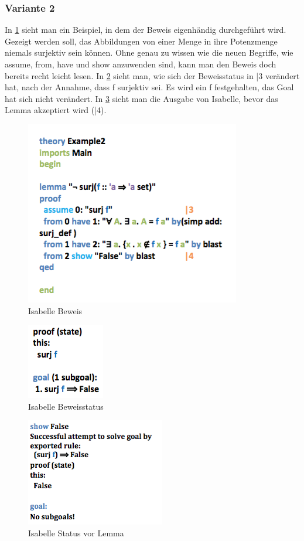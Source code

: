 \subsubsection*{Variante 2}
In \cref{fig:isabelle5} sieht man ein Beispiel, in dem der Beweis eigenhändig durchgeführt wird. Gezeigt werden soll, das Abbildungen von einer Menge in ihre Potenzmenge niemals surjektiv sein können. Ohne genau zu wissen wie die neuen Begriffe, wie assume, from, have und show anzuwenden sind, kann man den Beweis doch bereits recht leicht lesen.
In \cref{fig:isabelle6} sieht man, wie sich der Beweisstatus in |3 verändert hat, nach der Annahme, dass f surjektiv sei. Es wird ein f festgehalten, das Goal hat sich nicht verändert.
In \cref{fig:isabelle7} sieht man die Ausgabe von Isabelle, bevor das Lemma akzeptiert wird (|4).

\begin{figure}
\centering
\caption{Isabelle Beweis}
\label{fig:isabelle5}
\includegraphics[width=.3\textwidth]{chapters/theoremprovers/isabelle5.png}
\end{figure}

\begin{figure}
\centering
\caption{Isabelle Beweisstatus}
\label{fig:isabelle6}
\includegraphics[width=.15\textwidth]{chapters/theoremprovers/isabelle6.png}
\end{figure}

\begin{figure}
\centering
\caption{Isabelle Status vor Lemma}
\label{fig:isabelle7}
\includegraphics[width=.3\textwidth]{chapters/theoremprovers/isabelle7.png}
\end{figure}

